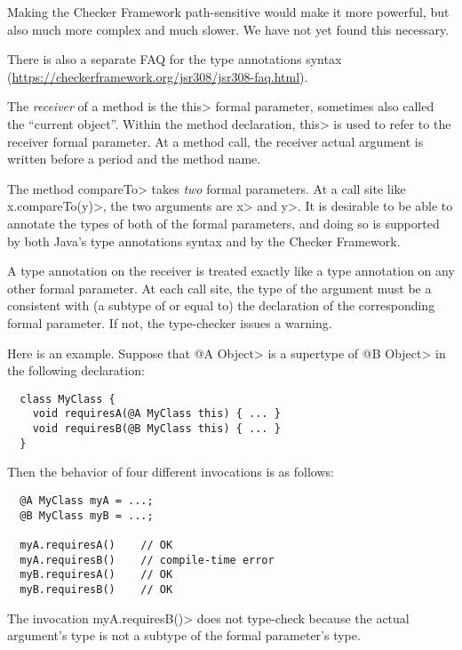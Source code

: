 Making the Checker Framework path-sensitive would make it more powerful,
but also much more complex and much slower.  We have not yet found this
necessary.



There is also a separate FAQ for the type annotations syntax
(\url{https://checkerframework.org/jsr308/jsr308-faq.html}).



The \emph{receiver} of a method is the \<this> formal parameter, sometimes
also called the ``current object''.  Within the method declaration, \<this>
is used to refer to the receiver formal parameter.  At a method call, the
receiver actual argument is written before a period and the method name.

The method \<compareTo> takes \emph{two} formal parameters.  At a call site
like \<x.compareTo(y)>, the two arguments are \<x> and \<y>.  It is
desirable to be able to annotate the types of both of the formal
parameters, and doing so is supported by both Java's type annotations
syntax and by the Checker Framework.

A type annotation on the receiver is treated exactly like a type annotation
on any other formal parameter.  At each call site, the type of the argument
must be a consistent with (a subtype of or equal to) the declaration of the
corresponding formal parameter.  If not, the type-checker issues a warning.

Here is an example.  Suppose that \<@A Object> is a supertype of \<@B
Object> in the following declaration:

\begin{Verbatim}
  class MyClass {
    void requiresA(@A MyClass this) { ... }
    void requiresB(@B MyClass this) { ... }
  }
\end{Verbatim}

\noindent
Then the behavior of four different invocations is as follows:

\begin{Verbatim}
  @A MyClass myA = ...;
  @B MyClass myB = ...;

  myA.requiresA()    // OK
  myA.requiresB()    // compile-time error
  myB.requiresA()    // OK
  myB.requiresB()    // OK
\end{Verbatim}

The invocation \<myA.requiresB()> does not type-check because the actual
argument's type is not a subtype of the formal parameter's type.

